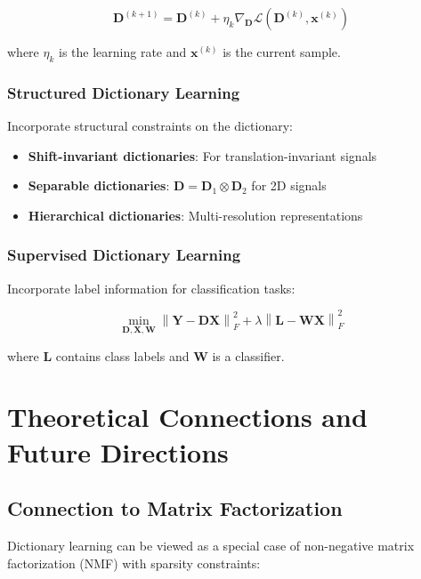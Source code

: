 \documentclass[12pt]{article}
\renewcommand{\vec}[1]{\mathbf{#1}}
\newcommand{\norm}[1]{\left\|#1\right\|}
\theoremstyle{definition}
\begin{document}
\begin{equation}
    \mathbf{D}^{(k+1)} = \mathbf{D}^{(k)} + \eta_k \nabla_{\mathbf{D}} \mathcal{L}(\mathbf{D}^{(k)}, \vec{x}^{(k)})
\end{equation}

where $\eta_k$ is the learning rate and $\vec{x}^{(k)}$ is the current sample.

\subsubsection{Structured Dictionary Learning}

Incorporate structural constraints on the dictionary:

\begin{itemize}
    \item \textbf{Shift-invariant dictionaries}: For translation-invariant signals
    \item \textbf{Separable dictionaries}: $\mathbf{D} = \mathbf{D}_1 \otimes \mathbf{D}_2$ for 2D signals
    \item \textbf{Hierarchical dictionaries}: Multi-resolution representations
\end{itemize}

\subsubsection{Supervised Dictionary Learning}

Incorporate label information for classification tasks:

\begin{equation}
    \min_{\mathbf{D}, \mathbf{X}, \mathbf{W}} \norm{\mathbf{Y} - \mathbf{D}\mathbf{X}}_F^2 + \lambda \norm{\mathbf{L} - \mathbf{W}\mathbf{X}}_F^2
\end{equation}

where $\mathbf{L}$ contains class labels and $\mathbf{W}$ is a classifier.

\newpage

\section{Theoretical Connections and Future Directions}

\subsection{Connection to Matrix Factorization}

Dictionary learning can be viewed as a special case of non-negative matrix factorization (NMF) with sparsity constraints:
\end{document}
